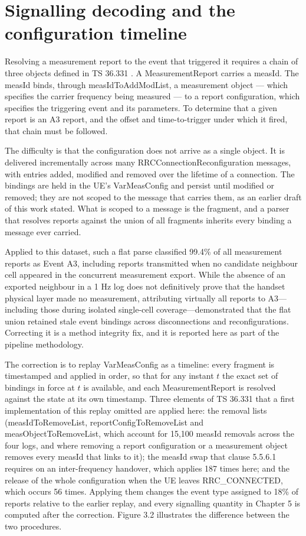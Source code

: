 \section{Signalling decoding and the configuration timeline}
\label{sec:3_3}

Resolving a measurement report to the event that triggered it requires a chain of three objects defined in TS 36.331 \cite{ref1}. A MeasurementReport carries a measId. The measId binds, through measIdToAddModList, a measurement object --- which specifies the carrier frequency being measured --- to a report configuration, which specifies the triggering event and its parameters. To determine that a given report is an A3 report, and the offset and time-to-trigger under which it fired, that chain must be followed.

The difficulty is that the configuration does not arrive as a single object. It is delivered incrementally across many RRCConnectionReconfiguration messages, with entries added, modified and removed over the lifetime of a connection. The bindings are held in the UE's VarMeasConfig and persist until modified or removed; they are not scoped to the message that carries them, as an earlier draft of this work stated. What is scoped to a message is the fragment, and a parser that resolves reports against the union of all fragments inherits every binding a message ever carried.

Applied to this dataset, such a flat parse classified 99.4\% of all measurement reports as Event A3, including reports transmitted when no candidate neighbour cell appeared in the concurrent measurement export. While the absence of an exported neighbour in a 1 Hz log does not definitively prove that the handset physical layer made no measurement, attributing virtually all reports to A3---including those during isolated single-cell coverage---demonstrated that the flat union retained stale event bindings across disconnections and reconfigurations. Correcting it is a method integrity fix, and it is reported here as part of the pipeline methodology.

The correction is to replay VarMeasConfig as a timeline: every fragment is timestamped and applied in order, so that for any instant $t$ the exact set of bindings in force at $t$ is available, and each MeasurementReport is resolved against the state at its own timestamp. Three elements of TS 36.331 that a first implementation of this replay omitted are applied here: the removal lists (measIdToRemoveList, reportConfigToRemoveList and measObjectToRemoveList, which account for 15,100 measId removals across the four logs, and where removing a report configuration or a measurement object removes every measId that links to it); the measId swap that clause 5.5.6.1 requires on an inter-frequency handover, which applies 187 times here; and the release of the whole configuration when the UE leaves RRC\_CONNECTED, which occurs 56 times. Applying them changes the event type assigned to 18\% of reports relative to the earlier replay, and every signalling quantity in Chapter 5 is computed after the correction. Figure 3.2 illustrates the difference between the two procedures.


